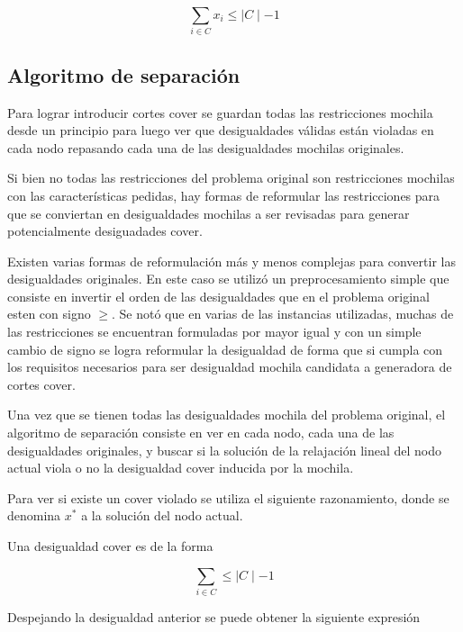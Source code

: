 \begin{equation}
\sum\limits_{i \in C} x_i \leq \mid C\mid - 1
\end{equation}


\bigskip
\subsection{Algoritmo de separaci\'on}

Para lograr introducir cortes cover se guardan todas las restricciones mochila desde un principio para luego ver que desigualdades v\'alidas est\'an violadas en cada nodo repasando cada una de las desigualdades mochilas originales.

Si bien no todas las restricciones del problema original son restricciones mochilas con las caracter\'isticas pedidas, hay formas de reformular las restricciones para que se conviertan en desigualdades mochilas a ser revisadas para generar potencialmente desiguadades cover.

Existen varias formas de reformulaci\'on m\'as y menos complejas para convertir las desigualdades originales. En este caso se utiliz\'o un preprocesamiento simple que consiste en invertir el orden de las desigualdades que en el problema original esten con signo $\geq$. Se not\'o que en varias de las instancias utilizadas, muchas de las restricciones se encuentran formuladas por mayor igual y con un simple cambio de signo se logra reformular la desigualdad de forma que si cumpla con los requisitos necesarios para ser desigualdad mochila candidata a generadora de cortes cover.



\bigskip

Una vez que se tienen todas las desigualdades mochila del problema original, el algoritmo de separaci\'on consiste en ver en cada nodo, cada una de las desigualdades originales, y buscar si la soluci\'on de la relajaci\'on lineal del nodo actual viola o no la desigualdad cover inducida por la mochila.



Para ver si existe un cover violado se utiliza el siguiente razonamiento, donde se denomina $x^*$ a la soluci\'on del nodo actual.

Una desigualdad cover es de la forma

\begin{equation}
\sum\limits_{i \in C} \leq \mid C \mid - 1
\end{equation}

Despejando la desigualdad anterior se puede obtener la siguiente expresi\'on


